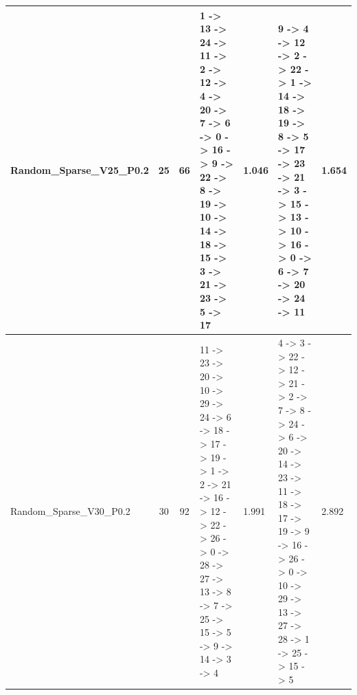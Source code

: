 \documentclass[8pt]{article}
\begin{document}
\begin{longtable}{@{}L{3.2cm} c c L{4cm} L{1.2cm} L{4cm} L{1.2cm}@{}}
Random\_Sparse\_V25\_P0.2 & 25 & 66 & 1 -\textgreater{} 13 -\textgreater{} 24 -\textgreater{} 11 -\textgreater{} 2 -\textgreater{} 12 -\textgreater{} 4 -\textgreater{} 20 -\textgreater{} 7 -\textgreater{} 6 -\textgreater{} 0 -\textgreater{} 16 -\textgreater{} 9 -\textgreater{} 22 -\textgreater{} 8 -\textgreater{} 19 -\textgreater{} 10 -\textgreater{} 14 -\textgreater{} 18 -\textgreater{} 15 -\textgreater{} 3 -\textgreater{} 21 -\textgreater{} 23 -\textgreater{} 5 -\textgreater{} 17 & 1.046 & 9 -\textgreater{} 4 -\textgreater{} 12 -\textgreater{} 2 -\textgreater{} 22 -\textgreater{} 1 -\textgreater{} 14 -\textgreater{} 18 -\textgreater{} 19 -\textgreater{} 8 -\textgreater{} 5 -\textgreater{} 17 -\textgreater{} 23 -\textgreater{} 21 -\textgreater{} 3 -\textgreater{} 15 -\textgreater{} 13 -\textgreater{} 10 -\textgreater{} 16 -\textgreater{} 0 -\textgreater{} 6 -\textgreater{} 7 -\textgreater{} 20 -\textgreater{} 24 -\textgreater{} 11 & 1.654 \\
\midrule
Random\_Sparse\_V30\_P0.2 & 30 & 92 & 11 -\textgreater{} 23 -\textgreater{} 20 -\textgreater{} 10 -\textgreater{} 29 -\textgreater{} 24 -\textgreater{} 6 -\textgreater{} 18 -\textgreater{} 17 -\textgreater{} 19 -\textgreater{} 1 -\textgreater{} 2 -\textgreater{} 21 -\textgreater{} 16 -\textgreater{} 12 -\textgreater{} 22 -\textgreater{} 26 -\textgreater{} 0 -\textgreater{} 28 -\textgreater{} 27 -\textgreater{} 13 -\textgreater{} 8 -\textgreater{} 7 -\textgreater{} 25 -\textgreater{} 15 -\textgreater{} 5 -\textgreater{} 9 -\textgreater{} 14 -\textgreater{} 3 -\textgreater{} 4 & 1.991 & 4 -\textgreater{} 3 -\textgreater{} 22 -\textgreater{} 12 -\textgreater{} 21 -\textgreater{} 2 -\textgreater{} 7 -\textgreater{} 8 -\textgreater{} 24 -\textgreater{} 6 -\textgreater{} 20 -\textgreater{} 14 -\textgreater{} 23 -\textgreater{} 11 -\textgreater{} 18 -\textgreater{} 17 -\textgreater{} 19 -\textgreater{} 9 -\textgreater{} 16 -\textgreater{} 26 -\textgreater{} 0 -\textgreater{} 10 -\textgreater{} 29 -\textgreater{} 13 -\textgreater{} 27 -\textgreater{} 28 -\textgreater{} 1 -\textgreater{} 25 -\textgreater{} 15 -\textgreater{} 5 & 2.892 \\
\midrule

\end{longtable}
\end{document}
